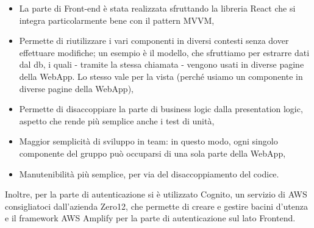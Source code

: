 \begin{itemize}
\item La parte di Front-end è stata realizzata sfruttando la libreria React che si integra particolarmente bene con il pattern MVVM,
\item Permette di riutilizzare i vari componenti in diversi contesti senza dover effettuare modifiche; un esempio è il modello, che sfruttiamo per estrarre dati dal db, i quali - tramite la stessa chiamata - vengono usati in diverse pagine della WebApp. Lo stesso vale per la vista (perché usiamo un componente in diverse pagine della WebApp),
\item Permette di disaccoppiare la parte di business logic dalla presentation logic, aspetto che rende più semplice anche i test di unità,
\item Maggior semplicità di sviluppo in team: in questo modo, ogni singolo componente del gruppo può occuparsi di una sola parte della WebApp,
\item Manutenibilità più semplice, per via del disaccoppiamento del codice.
\end{itemize}
Inoltre, per la parte di autenticazione si è utilizzato Cognito, un servizio di AWS consigliatoci dall'azienda Zero12, che permette di creare e gestire bacini d'utenza e il framework AWS Amplify per la parte di autenticazione sul lato Frontend.
